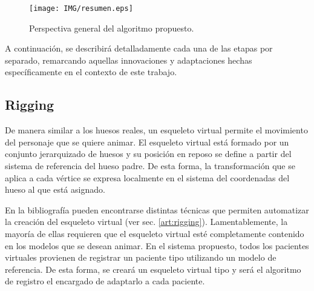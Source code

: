 \begin{figure}[!th]
   \centering
    \texttt{[image: IMG/resumen.eps]}%
    \caption{Perspectiva general del algoritmo propuesto.}
		\label{fig:Resumen}
\end{figure}


%

A continuación, se describirá detalladamente cada una de las etapas por separado, remarcando aquellas innovaciones y adaptaciones hechas específicamente en el contexto de este trabajo.



\subsection{Rigging}
\label{posing:rigging}
De manera similar a los huesos reales, un esqueleto virtual permite el movimiento del personaje que se quiere animar. El esqueleto virtual está formado por un conjunto jerarquizado de huesos y su posición en reposo se define a partir del sistema de referencia del hueso padre. De esta forma, la transformación que se aplica a cada vértice se expresa localmente en el sistema del coordenadas del hueso al que está asignado.  %



En la bibliografía pueden encontrarse distintas técnicas que permiten automatizar la creación del esqueleto virtual (ver sec. \ref{art:rigging}). Lamentablemente, la mayoría de ellas requieren que el esqueleto virtual esté completamente contenido en los modelos que se desean animar. En el sistema propuesto, todos los pacientes virtuales provienen de registrar un paciente tipo utilizando un modelo de referencia.  De esta forma, se creará un esqueleto virtual tipo y será el algoritmo de registro el encargado de adaptarlo a cada paciente.  %

